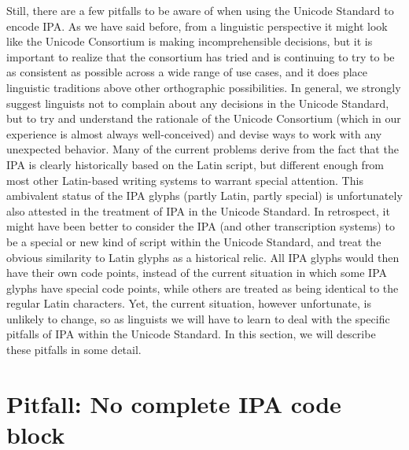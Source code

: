 Still, there are a few pitfalls to be aware of when using the Unicode Standard
to encode IPA. As we have said before, from a linguistic perspective it might
look like the Unicode Consortium is making incomprehensible decisions, but it is
important to realize that the consortium has tried and is continuing to try to
be as consistent as possible across a wide range of use cases, and it does place
linguistic traditions above other orthographic possibilities. In general, we
strongly suggest linguists not to complain about any decisions in the Unicode
Standard, but to try and understand the rationale of the Unicode Consortium
(which in our experience is almost always well-conceived) and devise ways to
work with any unexpected behavior. Many of the current problems derive from the
fact that the IPA is clearly historically based on the Latin script, but
different enough from most other Latin-based writing systems to warrant special
attention. This ambivalent status of the IPA glyphs (partly Latin, partly
special) is unfortunately also attested in the treatment of IPA in the Unicode
Standard. In retrospect, it might have been better to consider the IPA (and
other transcription systems) to be a special or new kind of script within the
Unicode Standard, and treat the obvious similarity to Latin glyphs as a
historical relic. All IPA glyphs would then have their own code points, instead
of the current situation in which some IPA glyphs have special code points,
while others are treated as being identical to the regular Latin characters.
Yet, the current situation, however unfortunate, is unlikely to change, so as
linguists we will have to learn to deal with the specific pitfalls of IPA within
the Unicode Standard. In this section, we will describe these pitfalls in some
detail.

\section{Pitfall: No complete IPA code block}
\label{pitfall-no-complete-ipa-block}

